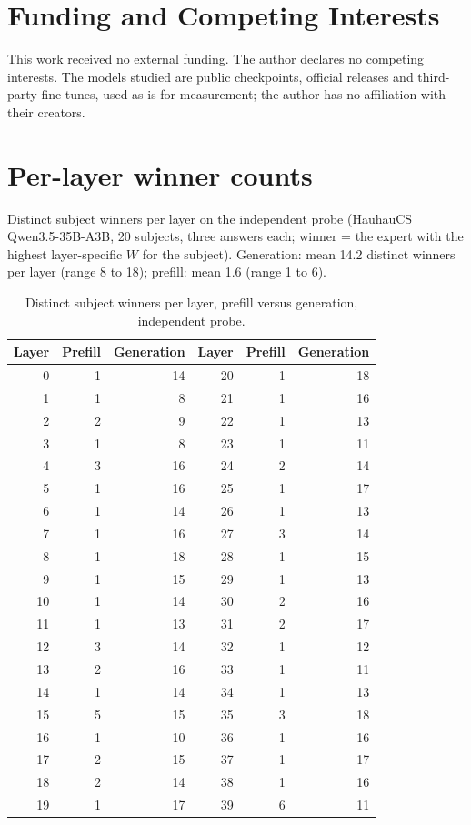 \documentclass[10pt,twocolumn]{article}
\begin{document}
\section*{Funding and Competing Interests}

This work received no external funding. The author declares no competing
interests. The models studied are public checkpoints, official releases and third-party fine-tunes, used as-is for
measurement; the author has no affiliation with their creators.




\appendix
\section{Per-layer winner counts}
\label{app:perlayer}
Distinct subject winners per layer on the independent probe (HauhauCS Qwen3.5-35B-A3B, 20 subjects, three answers each; winner = the expert with the highest layer-specific $W$ for the subject). Generation: mean 14.2 distinct winners per layer (range 8 to 18); prefill: mean 1.6 (range 1 to 6).

\begin{table}[h]
\centering\footnotesize
\setlength{\tabcolsep}{4pt}
\begin{tabular}{rrr@{\hspace{1.2em}}rrr}
\toprule
Layer & Prefill & Generation & Layer & Prefill & Generation \\
\midrule
0 & 1 & 14 & 20 & 1 & 18 \\
1 & 1 & 8 & 21 & 1 & 16 \\
2 & 2 & 9 & 22 & 1 & 13 \\
3 & 1 & 8 & 23 & 1 & 11 \\
4 & 3 & 16 & 24 & 2 & 14 \\
5 & 1 & 16 & 25 & 1 & 17 \\
6 & 1 & 14 & 26 & 1 & 13 \\
7 & 1 & 16 & 27 & 3 & 14 \\
8 & 1 & 18 & 28 & 1 & 15 \\
9 & 1 & 15 & 29 & 1 & 13 \\
10 & 1 & 14 & 30 & 2 & 16 \\
11 & 1 & 13 & 31 & 2 & 17 \\
12 & 3 & 14 & 32 & 1 & 12 \\
13 & 2 & 16 & 33 & 1 & 11 \\
14 & 1 & 14 & 34 & 1 & 13 \\
15 & 5 & 15 & 35 & 3 & 18 \\
16 & 1 & 10 & 36 & 1 & 16 \\
17 & 2 & 15 & 37 & 1 & 17 \\
18 & 2 & 14 & 38 & 1 & 16 \\
19 & 1 & 17 & 39 & 6 & 11 \\
\bottomrule
\end{tabular}
\caption{Distinct subject winners per layer, prefill versus generation, independent probe.}
\label{tab:perlayer}
\end{table}
\end{document}
